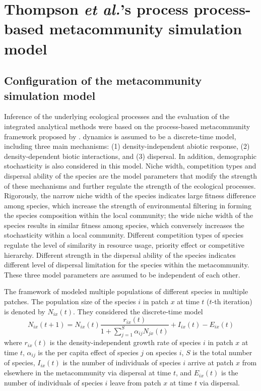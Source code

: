 \section{Thompson \textit{et al.}'s process process-based metacommunity simulation model}
\label{sec:thom}
\subsection{Configuration of the metacommunity simulation model}
\noindent
Inference of the underlying ecological processes and the evaluation of the integrated analytical methods were based on the process-based metacommunity framework proposed by \citet{thompson2020process}. \DIFdelbegin {}\DIFdelend \DIFaddbegin {}\DIFaddend dynamics is assumed to be a discrete-time model, including three main mechanisms: (1) density-independent abiotic response, (2) density-dependent biotic interactions, and (3) dispersal. In addition, demographic stochasticity is also considered in this model. Niche width, competition types and dispersal ability of the species are the model parameters that modify the strength of these mechanisms and further regulate the strength of the ecological processes. Rigorously, the narrow niche width of the species indicates large fitness difference among species, which increase the strength of environmental filtering in forming the species composition within the local community; the wide niche width of the species results in similar fitness among species, which conversely increases the stochasticity within a local community. Different competition types of species regulate the level of similarity in resource usage, priority effect or competitive hierarchy. Different strength in the dispersal ability of the species indicates different level of dispersal limitation for the species within the metacommunity. These three model parameters are assumed to be independent of each other. 

The framework of \citet{thompson2020process} modeled multiple populations of different species in multiple patches. The population size of the species $i$ in patch $x$ at time $t$ ($t$-th iteration) is denoted by $N_{ix}(t)$. They considered the discrete-time model
\[
N_{ix}(t+1) = N_{ix}(t)\dfrac{r_{ix}(t)}{1+\sum_{j = 1}^S\alpha_{ij}N_{jx}(t)} + I_{ix}(t) - E_{ix}(t)
\]
where 
$r_{ix}(t)$ is the density-independent growth rate of species $i$ in patch $x$ at time $t$, $\alpha_{ij}$ is the per capita effect of species $j$ on species $i$, $S$ is the total number of species, $I_{ix}(t)$ is the number of individuals of species $i$ arrive at patch $x$ from elsewhere in the metacommunity via dispersal at time $t$, and $E_{ix}(t)$ is the number of individuals of species $i$ leave from patch $x$ at time $t$ via dispersal.



